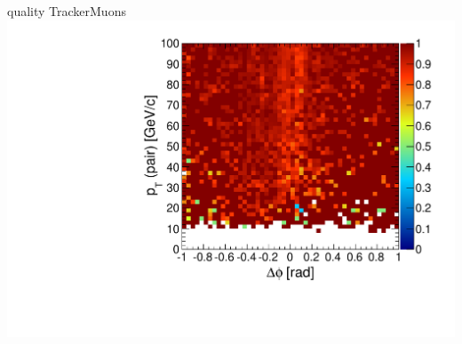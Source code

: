 \documentclass[compress]{beamer}
\begin{document}
\begin{frame}
\begin{columns}
\centering quality TrackerMuons
\includegraphics[width=\linewidth]{endcap_dphipt_droverz01cut_TrackerMuon.pdf}
\end{columns}
\end{frame}

\end{document}
